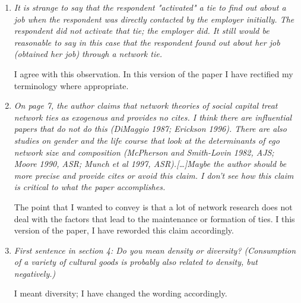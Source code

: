 \documentclass[11pt]{article}
\begin{document}
\begin{enumerate}
	Once again, I appreciate the reviewer's very good point.  This version of the paper now includes an analysis of the sort recommended by the reviewer and, as the reviewer will appreciate, the results broadly support the argument.
	
	\item \emph{It is strange to say that the respondent "activated" a tie to find out about a job when the respondent was directly contacted by the employer initially. The respondent did not activate that tie; the employer did. It still would be reasonable to say in this case that the respondent found out about her job (obtained her job) through a network tie.}
	
	I agree with this observation.  In this version of the paper I have rectified my terminology where appropriate.	
	
	\item \emph{On page 7, the author claims that network theories of social capital treat network ties as exogenous and provides no cites. I think there are influential papers that do not do this (DiMaggio 1987; Erickson 1996). There are also studies on gender and the life course that look at the determinants of ego network size and composition (McPherson and Smith-Lovin 1982, AJS; Moore 1990, ASR; Munch et al 1997, ASR).[\ldots]Maybe the author should be more precise and provide cites or avoid this claim. I don't see how this claim is critical to what the paper accomplishes.}
	
	The point that I wanted to convey is that a lot of network research does not deal with the factors that lead to the maintenance or formation of ties. I this version of the paper, I have reworded this claim accordingly.
	
	\item \emph{First sentence in section 4: Do you mean density or diversity? (Consumption of a variety of cultural goods is probably also related to density, but negatively.)}
	
	I meant diversity; I have changed the wording accordingly.	
\end{enumerate}
\end{document}
